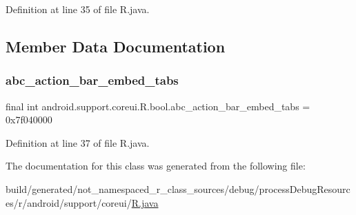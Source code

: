 Definition at line 35 of file R.\+java.


\begin{DoxyCode}{0}

\end{DoxyCode}


\subsection{Member Data Documentation}
\mbox{\label{classandroid_1_1support_1_1coreui_1_1_r_1_1bool_a8f4c5f52b403fce26b4e70370bf2e2d3}} 
\subsubsection{\texorpdfstring{abc\_action\_bar\_embed\_tabs}{abc\_action\_bar\_embed\_tabs}}
{\footnotesize\ttfamily final int android.\+support.\+coreui.\+R.\+bool.\+abc\+\_\+action\+\_\+bar\+\_\+embed\+\_\+tabs = 0x7f040000\hspace{0.3cm}{\ttfamily [static]}}



Definition at line 37 of file R.\+java.



The documentation for this class was generated from the following file\+:\begin{DoxyCompactItemize}
\item 
build/generated/not\+\_\+namespaced\+\_\+r\+\_\+class\+\_\+sources/debug/process\+Debug\+Resources/r/android/support/coreui/\mbox{\hyperlink{android_2support_2coreui_2_r_8java}{R.\+java}}\end{DoxyCompactItemize}
